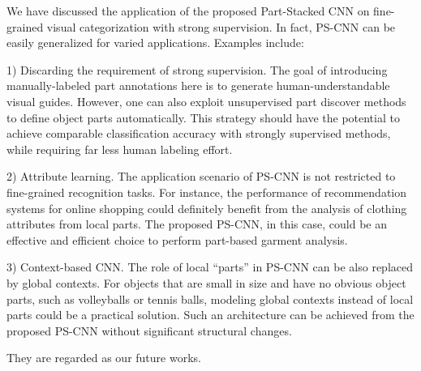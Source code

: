\documentclass[10pt,twocolumn,letterpaper]{article}
\begin{document}
We have discussed the application of the proposed Part-Stacked CNN on fine-grained visual categorization with strong supervision. In fact, PS-CNN can be easily generalized for varied applications. Examples include:

1) Discarding the requirement of strong supervision. The goal of introducing manually-labeled part annotations here is to generate human-understandable visual guides. However, one can also exploit unsupervised part discover methods \cite{krause2015fine} to define object parts automatically. This strategy should have the potential to achieve comparable classification accuracy with strongly supervised methods, while requiring far less human labeling effort.

2) Attribute learning. The application scenario of PS-CNN is not restricted to fine-grained recognition tasks. For instance, the performance of recommendation systems for online shopping \cite{kiapour2015where} could definitely benefit from the analysis of clothing attributes from local parts. The proposed PS-CNN, in this case, could be an effective and efficient choice to perform part-based garment analysis.

3) Context-based CNN. The role of local ``parts'' in PS-CNN can be also replaced by global contexts. For objects that are small in size and have no obvious object parts, such as volleyballs or tennis balls, modeling global contexts instead of local parts could be a practical solution. Such an architecture can be achieved from the proposed PS-CNN without significant structural changes.

They are regarded as our future works.
\end{document}
